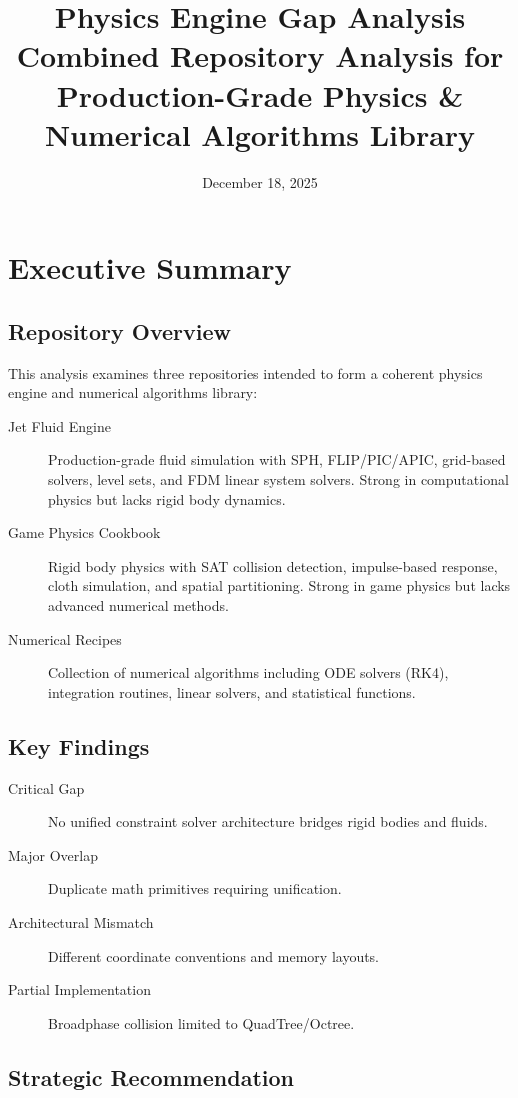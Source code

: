 \documentclass[11pt]{article}
\title{Physics Engine Gap Analysis\\\large Combined Repository Analysis for Production-Grade Physics \& Numerical Algorithms Library}
\author{}
\date{December 18, 2025}
\begin{document}
\maketitle

\section{Executive Summary}

\subsection{Repository Overview}

This analysis examines three repositories intended to form a coherent physics engine and numerical algorithms library:

\begin{description}
\item[Jet Fluid Engine] Production-grade fluid simulation with SPH, FLIP/PIC/APIC, grid-based solvers, level sets, and FDM linear system solvers. Strong in computational physics but lacks rigid body dynamics.
\item[Game Physics Cookbook] Rigid body physics with SAT collision detection, impulse-based response, cloth simulation, and spatial partitioning. Strong in game physics but lacks advanced numerical methods.
\item[Numerical Recipes] Collection of numerical algorithms including ODE solvers (RK4), integration routines, linear solvers, and statistical functions.
\end{description}

\subsection{Key Findings}

\begin{description}
\item[Critical Gap] No unified constraint solver architecture bridges rigid bodies and fluids.
\item[Major Overlap] Duplicate math primitives requiring unification.
\item[Architectural Mismatch] Different coordinate conventions and memory layouts.
\item[Partial Implementation] Broadphase collision limited to QuadTree/Octree.
\end{description}

\subsection{Strategic Recommendation}
\end{document}
